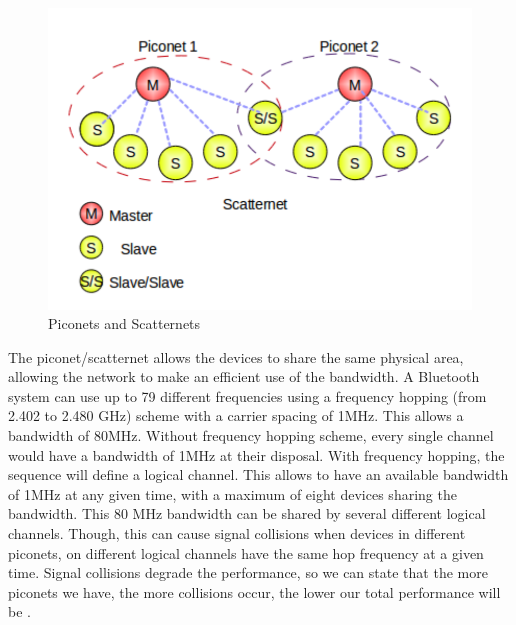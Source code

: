 \documentclass[a4paper, 11pt]{report}
\begin{document}
	\begin{figure}[ht]
		\centering	
		\includegraphics[scale=0.60]{images/scatternet.pdf} 
		\caption{Piconets and Scatternets}\label{fig:scatternet}
	\end{figure}

The piconet/scatternet allows the devices to share the same physical area, allowing the network to make an efficient use of the bandwidth. A Bluetooth system can use up to 79 different frequencies using a frequency hopping (from 2.402 to 2.480 GHz) \cite{bluetoothStack} scheme with a carrier spacing of 1MHz. This allows a bandwidth of 80MHz. Without frequency hopping scheme, every single channel would have a bandwidth of 1MHz at their disposal. With frequency hopping, the sequence will define a logical channel. This allows to have an available bandwidth of 1MHz at any given time, with a maximum of eight devices sharing the bandwidth. This 80 MHz bandwidth can be shared by several different logical channels. Though, this can cause signal collisions when devices in different piconets, on different logical channels have the same hop frequency at a given time. Signal collisions degrade the performance, so we can state that the more piconets we have, the more collisions occur, the lower our total performance will be \cite{introBluetooth}.
\end{document}
